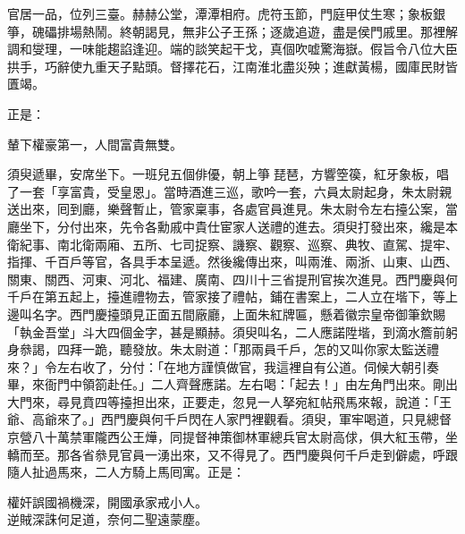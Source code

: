 \begin{myquote}
官居一品，位列三臺。赫赫公堂，潭潭相府。虎符玉節，門庭甲仗生寒；象板銀箏，磈礧排場熱鬧。終朝謁見，無非公子王孫；逐歲追遊，盡是侯門戚里。那裡解調和燮理，一味能趨諂逢迎。端的談笑起干戈，真個吹嘘驚海嶽。假旨令八位大臣拱手，巧辭使九重天子點頭。督擇花石，江南淮北盡災殃；進獻黃楊，國庫民財皆匱竭。
\end{myquote}

正是：

\begin{myquote}
輦下權豪第一，人間富貴無雙。
\end{myquote}

須臾遞畢，安席坐下。一班兒五個俳優，朝上箏𥱧琵琶，方響箜篌，紅牙象板，唱了一套「享富貴，受皇恩」。當時酒進三巡，歌吟一套，六員太尉起身，朱太尉親送出來，囘到廳，樂聲暫止，管家稟事，各處官員進見。朱太尉令左右擡公案，當廳坐下，分付出來，先令各勳戚中貴仕宦家人送禮的進去。須臾打發出來，纔是本衛紀事、南北衛兩廂、五所、七司捉察、譏察、觀察、巡察、典牧、直駕、提牢、指揮、千百戶等官，各具手本呈遞。然後纔傳出來，叫兩淮、兩浙、山東、山西、關東、關西、河東、河北、福建、廣南、四川十三省提刑官挨次進見。西門慶與何千戶在第五起上，擡進禮物去，管家接了禮帖，鋪在書案上，二人立在堦下，等上邊叫名字。西門慶擡頭見正面五間廠廳，上面朱紅牌匾，懸着徽宗皇帝御筆欽賜「執金吾堂」斗大四個金字，甚是顯赫。須臾叫名，二人應諾陞堦，到滴水簷前躬身叅謁，四拜一跪，聽發放。朱太尉道：「那兩員千戶，怎的又叫你家太監送禮來？」令左右收了，分付：「在地方謹慎做官，我這裡自有公道。伺候大朝引奏畢，來衙門中領箚赴任。」二人齊聲應諾。左右喝：「起去！」由左角門出來。剛出大門來，尋見賁四等擡担出來，正要走，忽見一人拏宛紅帖飛馬來報，說道：「王爺、高爺來了。」西門慶與何千戶閃在人家門裡觀看。須臾，軍牢喝道，只見總督京營八十萬禁軍隴西公王燁，同提督神策御林軍總兵官太尉高俅，俱大紅玉帶，坐轎而至。那各省叅見官員一湧出來，又不得見了。西門慶與何千戶走到僻處，呼跟隨人扯過馬來，二人方騎上馬囘寓。正是：

\begin{myquote}
權奸誤國禍機深，開國承家戒小人。\\逆賊深誅何足道，奈何二聖遠蒙塵。
\end{myquote}

